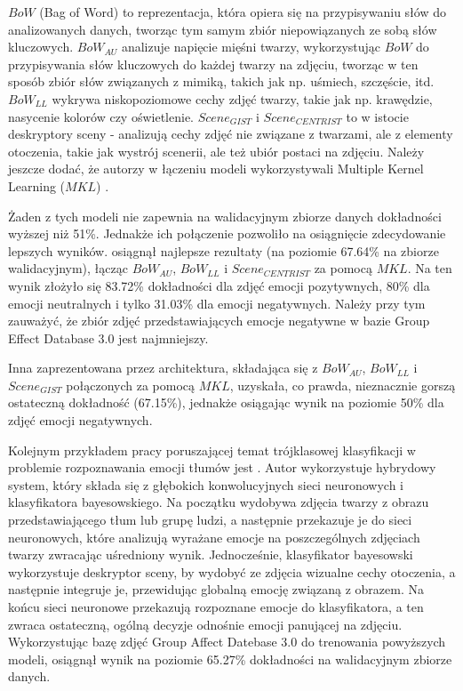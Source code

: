$BoW$ (Bag of Word) \cite{BoW} to reprezentacja, która opiera się na przypisywaniu słów do analizowanych danych, tworząc tym samym zbiór niepowiązanych ze sobą słów kluczowych.
$BoW_{AU}$ analizuje napięcie mięśni twarzy, wykorzystując $BoW$ do przypisywania słów kluczowych do każdej twarzy na zdjęciu, tworząc w ten sposób zbiór słów związanych z mimiką, takich jak np. uśmiech, szczęście, itd.
$BoW_{LL}$ wykrywa niskopoziomowe cechy zdjęć twarzy, takie jak np. krawędzie, nasycenie kolorów czy oświetlenie. 
$Scene_{GIST}$ i $Scene_{CENTRIST}$ to w istocie deskryptory sceny - analizują cechy zdjęć nie związane z twarzami, ale z elementy otoczenia, takie jak wystrój scenerii, ale też ubiór postaci na zdjęciu.
Należy jeszcze dodać, że autorzy w łączeniu modeli wykorzystywali Multiple Kernel Learning ($MKL$) \cite{MKL}. 

Żaden z tych modeli nie zapewnia na walidacyjnym zbiorze danych dokładności wyższej niż 51\%. Jednakże ich połączenie pozwoliło na osiągnięcie zdecydowanie lepszych wyników. \cite{GAD} osiągnął najlepsze rezultaty (na poziomie 67.64\% na zbiorze walidacyjnym), łącząc $BoW_{AU}$, $BoW_{LL}$ i $Scene_{CENTRIST}$ za pomocą $MKL$. Na ten wynik złożyło się 83.72\% dokładności dla zdjęć emocji pozytywnych, 80\% dla emocji neutralnych i tylko 31.03\% dla emocji negatywnych. Należy przy tym zauważyć, że zbiór zdjęć przedstawiających emocje negatywne w bazie Group Effect Database 3.0 jest najmniejszy.

Inna zaprezentowana przez \cite{GAD} architektura, składająca się z $BoW_{AU}$, $BoW_{LL}$ i $Scene_{GIST}$ połączonych za pomocą $MKL$, uzyskała, co prawda, nieznacznie gorszą ostateczną dokładność (67.15\%), jednakże osiągając wynik na poziomie 50\% dla zdjęć emocji negatywnych.

Kolejnym przykładem pracy poruszającej temat trójklasowej klasyfikacji w problemie rozpoznawania emocji tłumów jest \cite{SGarg}. Autor wykorzystuje hybrydowy system, który składa się z głębokich konwolucyjnych sieci neuronowych i klasyfikatora bayesowskiego. Na początku wydobywa zdjęcia twarzy z obrazu przedstawiającego tłum lub grupę ludzi, a następnie przekazuje je do sieci neuronowych, które analizują wyrażane emocje na poszczególnych zdjęciach twarzy zwracając uśredniony wynik. Jednocześnie, klasyfikator bayesowski wykorzystuje deskryptor sceny, by wydobyć ze zdjęcia wizualne cechy otoczenia, a następnie integruje je, przewidując globalną emocję związaną z obrazem. Na końcu sieci neuronowe przekazują rozpoznane emocje do klasyfikatora, a ten zwraca ostateczną, ogólną decyzje odnośnie emocji panującej na zdjęciu. Wykorzystując bazę zdjęć Group Affect Datebase 3.0 do trenowania powyższych modeli, \cite{SGarg} osiągnął wynik na poziomie 65.27\% dokładności na walidacyjnym zbiorze danych.


